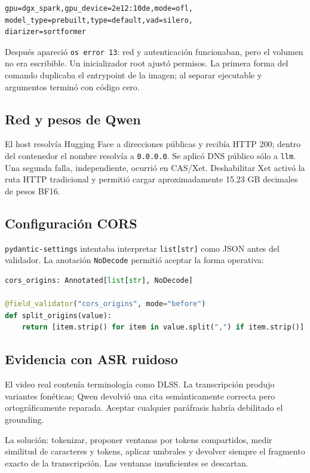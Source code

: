 \documentclass[11pt,a4paper]{article}
\begin{document}
\begin{lstlisting}
gpu=dgx_spark,gpu_device=2e12:10de,mode=ofl,
model_type=prebuilt,type=default,vad=silero,
diarizer=sortformer
\end{lstlisting}

Después apareció \texttt{os error 13}: red y autenticación funcionaban, pero el
volumen no era escribible. Un inicializador root ajustó permisos. La primera
forma del comando duplicaba el entrypoint de la imagen; al separar ejecutable y
argumentos terminó con código cero.

\subsection{Red y pesos de Qwen}
El host resolvía Hugging Face a direcciones públicas y recibía HTTP 200; dentro
del contenedor el nombre resolvía a \texttt{0.0.0.0}. Se aplicó DNS público sólo a
\texttt{llm}. Una segunda falla, independiente, ocurrió en CAS/Xet. Deshabilitar
Xet activó la ruta HTTP tradicional y permitió cargar aproximadamente 15.23 GB
decimales de pesos BF16.

\subsection{Configuración CORS}
\texttt{pydantic-settings} intentaba interpretar \texttt{list[str]} como JSON
antes del validador. La anotación \texttt{NoDecode} permitió aceptar la forma
operativa:

\begin{lstlisting}[language=Python]
cors_origins: Annotated[list[str], NoDecode]

@field_validator("cors_origins", mode="before")
def split_origins(value):
    return [item.strip() for item in value.split(",") if item.strip()]
\end{lstlisting}

\subsection{Evidencia con ASR ruidoso}
El video real contenía terminología como DLSS. La transcripción produjo variantes
fonéticas; Qwen devolvió una cita semánticamente correcta pero ortográficamente
reparada. Aceptar cualquier paráfrasis habría debilitado el grounding.

La solución: tokenizar, proponer ventanas por tokens compartidos, medir similitud
de caracteres y tokens, aplicar umbrales y devolver siempre el fragmento exacto
de la transcripción. Las ventanas insuficientes se descartan.
\end{document}
